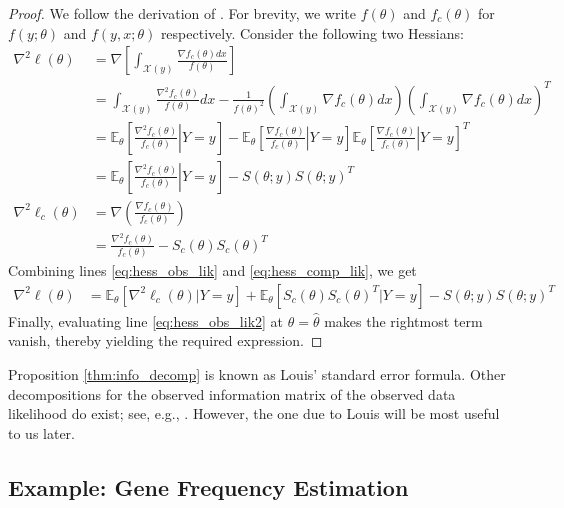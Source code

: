 \documentclass[11pt, oneside]{article}   	%
\newcommand{\bE}{\mathbb{E}}
\begin{document}
\begin{proof}
    We follow the derivation of \citet{Lou82}. For brevity, we write $f(\theta)$ and $f_c(\theta)$ for $f(y; \theta)$ and $f(y, x; \theta)$ respectively. Consider the following two Hessians:
    \begin{align}
        \nabla^2 \ell(\theta) &= \nabla \left[ \int_{\mathcal{X}(y)} \frac{\nabla f_c(\theta) dx}{f(\theta)} \right]\\
        &= \int_{\mathcal{X}(y)} \frac{\nabla^2 f_c(\theta)}{f(\theta)} dx - \frac{1}{f(\theta)^2}\left( \int_{\mathcal{X}(y)} \nabla f_c(\theta) dx \right) \left( \int_{\mathcal{X}(y)} \nabla f_c(\theta) dx \right)^T\\
        &= \bE_\theta \left[ \left. \frac{\nabla^2 f_c(\theta)}{f_c(\theta)} \right| Y=y \right] - \bE_\theta \left[ \left. \frac{\nabla f_c(\theta)}{f_c(\theta)} \right| Y=y \right] \bE_\theta \left[ \left. \frac{\nabla f_c(\theta)}{f_c(\theta)} \right| Y=y \right]^T\\
        &= \bE_\theta \left[ \left. \frac{\nabla^2 f_c(\theta)}{f_c(\theta)} \right| Y=y \right] - S(\theta; y) S(\theta; y)^T \label{eq:hess_obs_lik}\\
        \nabla^2 \ell_c(\theta) &= \nabla \left( \frac{\nabla f_c(\theta)}{f_c(\theta)} \right)\\
        &= \frac{\nabla^2 f_c(\theta)}{f_c(\theta)} - S_c(\theta) S_c(\theta)^T \label{eq:hess_comp_lik}
    \end{align}
    Combining lines \ref{eq:hess_obs_lik} and \ref{eq:hess_comp_lik}, we get
    \begin{align}
        \nabla^2 \ell(\theta) &= \bE_\theta [ \nabla^2 \ell_c(\theta) | Y=y] + \bE_\theta [ S_c(\theta) S_c(\theta)^T | Y=y] - S(\theta; y) S(\theta; y)^T \label{eq:hess_obs_lik2}
    \end{align}
    Finally, evaluating line \ref{eq:hess_obs_lik2} at $\theta = \hat{\theta}$ makes the rightmost term vanish, thereby yielding the required expression.
\end{proof}

Proposition \ref{thm:info_decomp} is known as Louis' standard error formula. Other decompositions for the observed information matrix of the observed data likelihood do exist; see, e.g., \citet{Oak99,McL08}. However, the one due to Louis will be most useful to us later.

\subsection{Example: Gene Frequency Estimation}
\label{sec:eg-genes}
\end{document}
